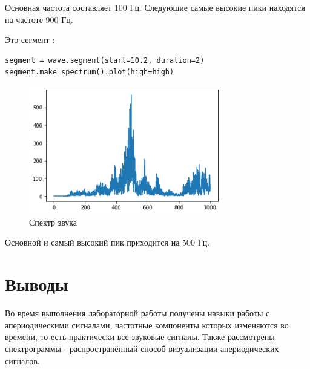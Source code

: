 \documentclass[a4paper,12pt]{report}
\begin{document}
Основная частота составляет 100 Гц. Следующие самые высокие пики находятся на частоте 900 Гц.

Это сегмент :

\begin{lstlisting}[caption=Спектр звука \textquote{u}]
segment = wave.segment(start=10.2, duration=2)
segment.make_spectrum().plot(high=high)
\end{lstlisting}

\begin{figure}[H]
        \centering
        \includegraphics[width=0.75\textwidth]{lab3_fig6_6.png}
        \caption{Спектр звука }
        \label{fig:lab3_fig6_6}
\end{figure}

Основной и самый высокий пик приходится на 500 Гц.

\chapter{Выводы}

Во время выполнения лабораторной работы получены навыки работы с апериодическими сигналами, частотные компоненты которых изменяются во времени, то есть практически все звуковые сигналы. Также рассмотрены спектрограммы - распространённый способ визуализации апериодических сигналов.
\end{document}
